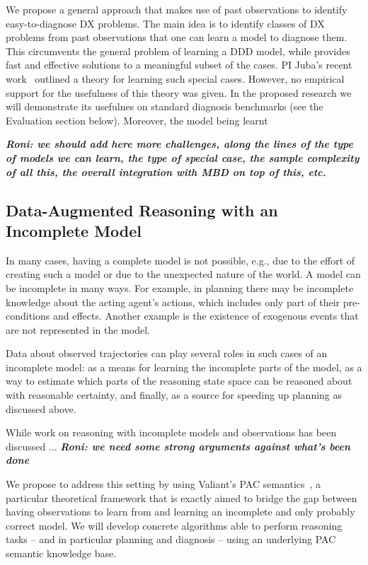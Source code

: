 \documentclass[12pt]{article}
\newcommand{\note}[1]{\textbf{\textit{#1}}}
\begin{document}
We propose a general approach that makes use of past observations to identify easy-to-diagnose DX problems. The main idea is to identify classes of DX problems from past observations that one can learn a model to diagnose them. This circumvents the general problem of learning a DDD model, while provides fast and effective solutions to a meaningful subset of the cases. 
PI Juba's recent work~\cite{juba2016aaai} outlined a theory for learning such special cases. However, no empirical support for the usefulness of this theory was given. In the proposed research we will demonstrate its usefulnes on standard diagnosis benchmarks (see the Evaluation section below). Moreover, the model being learnt

\note{Roni: we should add here more challenges, along the lines of the type of models we can learn, the type of special case, the sample complexity of all this, the overall integration with MBD on top of this, etc.}




\subsection{Data-Augmented Reasoning with an Incomplete Model}

In many cases, having a complete model is not possible, e.g., due to the effort of creating such a model or due to the unexpected nature of the world. A model can be incomplete in many ways. For example, in planning there may be incomplete knowledge about the acting agent's actions, which includes only part of their pre-conditions and effects. Another example is the existence of exogenous events that are not represented in the model. 

Data about observed trajectories can play several roles in such cases of an incomplete model: as a means for learning the incomplete parts of the model, as a way to estimate which parts of the reasoning state space can be reasoned about with reasonable certainty, 
and finally, as a source for speeding up planning as discussed above. 

While work on reasoning with incomplete models and observations has been discussed ... \note{Roni: we need some strong arguments against what's been done}


We propose to address this setting by using Valiant's PAC semantics~\cite{valiant2000robustLogics}, a particular theoretical framework that is exactly aimed to bridge the gap between having observations to learn from and learning an incomplete and only probably correct model. We will develop concrete algorithms able to perform reasoning tasks -- and in particular planning and diagnosis -- using an underlying PAC semantic knowledge base. 
\end{document}
